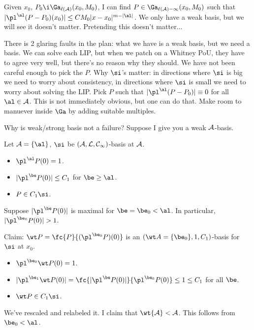 Given $x_0$, $P_0\i \Ga_{\ell(\cal A)}(x_0,M_0)$, I can find $P\in \Ga_{\ell(\cal A)-1}(x_0,M_0)$ such that $|\pl^\al (P-P_0)(x_0)| \le CM_0|x-x_0|^{m-|\al|}$. 
We only have a weak basis, but we will see it doesn't matter. Pretending this doesn't matter...

There is 2 glaring faults in the plan: what we have is a weak basis, but we need a basis. We can solve each LIP, but when we patch on a Whitney PoU, they have to agree very well, but there's no reason why they should. We have not been careful enough to pick the $P$. Why $\si$'s matter: in directions where $\si$ is big we need to worry about consistency, in directions where $\si$ is small we need to worry about solving the LIP.  %
Pick $P$ such that $|\pl^\al (P-P_0)|\equiv 0$ for all $\al\in \cal A$. This is not immediately obvious, but one can do that.
Make room to manuever inside $\Ga$ by adding suitable multiples.




Why is weak/strong basis not a failure?
Suppose I give you a weak $\cal A$-basis.


Let $\cal A=\{\al\}$, $\si$ be $(\cal A,L,C_1)$-basis at $\cal A$. 
\begin{itemize}
\item
$\pl^\al P(0)=1$.                                                                                                                                                                                                                                                        
\item
$|\pl^\be P(0)|\le C_1$ for $\be \ge \al$.
\item
$P \in  C_1 \si$.
\end{itemize}
Suppose $|\pl^\be P(0)|$ is maximal for $\be=\be_0<\al$. In particular, $|\pl^{\be_0}P(0)|>1$. 

Claim: $\wt P= \fc{P}{(\pl^{\be_0}P)(0)}$ is an $(\wt A=\{\be_0\}, 1, C_1)$-basis for $\si$ at $x_0$. %
\begin{itemize}
\item
$\pl^{\be_0} \wt P(0)=1$.
\item
$|\pl^{\be_1}\wt P(0)| = \fc{|\pl^\be P(0)|}{\pl^{\be_0}P(0)} \le 1\le C_1$ for all $\be$. 
\item
$\wt P\in C_1\si$. 
\end{itemize}
We've rescaled and relabeled it. 
I claim that $\wt{\cal A}< \cal A$. This follows from $\be_0<\al$.

